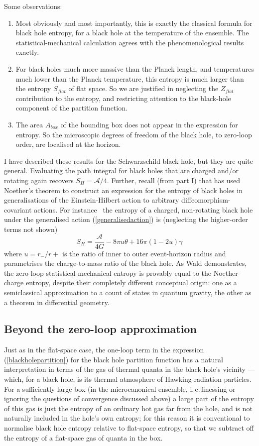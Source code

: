 \documentclass[12pt]{article}
\newcommand{\iec}{\mbox{i.\,e.\,}}
\newcommand{\mc}[1]{\ensuremath{\mathcal{#1}}}
\newcommand{\be}{\begin{equation}}
\newcommand{\ee}{\end{equation}}
\begin{document}
Some observations:
\begin{enumerate}
\item Most obviously and most importantly, this is exactly the classical formula for black hole entropy, for a black hole at the temperature of the ensemble. The statistical-mechanical calculation agrees with the phenomenological results exactly.
\item For black holes much more massive than the Planck length, and temperatures much lower than the Planck temperature, this entropy is much larger than the entropy $S_{flat}$ of flat space. So we are justified in neglecting the $Z_{flat}$ contribution to the entropy, and restricting attention to the black-hole component of the partition function.
\item The area $A_{box}$ of the bounding box does not appear in the expression for entropy. So the microscopic degrees of freedom of the black hole, to zero-loop order, are localised at the horizon. 
\end{enumerate}
I have described these results for the Schwarzschild black hole, but they are quite general. Evaluating the path integral for black holes that are charged and/or rotating again recovers $S_H=\mc{A}/4$. Further, recall (from part I) that  has used Noether's theorem to construct an expression for the entropy of black holes in generalisations of the Einstein-Hilbert action to arbitrary diffeomorphism-covariant actions. For instance~\cite{demersetal} the entropy of a charged, non-rotating black hole under the generalised action (\ref{generalisedaction}) is (neglecting the higher-order terms not shown)
\be \label{blackholenoether}
S_H = \frac{\mc{A}}{4 G} - 8 \pi u \theta + 16\pi  (1-2u) \gamma
\ee
where $u=r_-/r+$ is the ratio of inner to outer event-horizon radius and parametrises the charge-to-mass ratio of the black hole.
As Wald demonstrates, the zero-loop statistical-mechanical entropy is provably equal to the Noether-charge entropy, despite their completely different conceptual origin: one as  a semiclassical approximation to a count of states in quantum gravity, the other as a theorem in differential geometry.

\subsection{Beyond the zero-loop approximation}\label{oneloop}

Just as in the flat-space case, the one-loop term in the expression (\ref{blackholepartition}) for the black hole partition function has a natural interpretation in terms of the gas of thermal quanta in the black hole's vicinity --- which, for a black hole, is its thermal atmosphere of Hawking-radiation particles. For a sufficiently large box (in the microcanonical ensemble, \iec finessing or ignoring the questions of convergence discussed above) a large part of the entropy of this gas is just the entropy of an ordinary hot gas far from the hole, and is not naturally included in the hole's own entropy; for this reason it is conventional to normalise black hole entropy relative to flat-space entropy, so that we subtract off the entropy of a flat-space gas of quanta in the box. 
\end{document}
